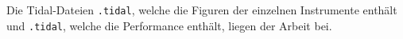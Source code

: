 \documentclass[
10pt, %
a4paper, %
oneside, %
headinclude,footinclude, %
BCOR5mm, %
]{scrartcl}
\begin{document}
\noindent Die Tidal-Dateien \verb|.tidal|, welche die Figuren der einzelnen Instrumente enthält und \verb|.tidal|, welche die Performance enthält, liegen der Arbeit bei.
\pagebreak




\renewcommand{\refname}{\spacedlowsmallcaps{Literatur/Quellen}} %




\end{document}
